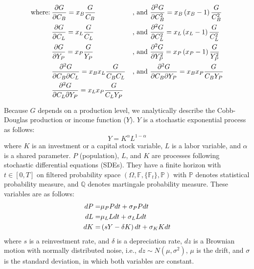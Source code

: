 \documentclass[sn-basic]{sn-jnl}%
\theoremstyle{thmstyleone}%
\theoremstyle{thmstyletwo}%
\theoremstyle{thmstylethree}%
\begin{document}
\begin{appendices}
	\begin{align}
			\text{where:}\: & \frac{\partial G}{\partial C_B}=x_B\frac{G}{C_B}       & \text{, and } & \frac{\partial^2 G}{\partial C_B^2}=x_B\left(x_B-1\right)\frac{G}{C_B^2}                         \notag\\
			& \frac{\partial G}{\partial C_L}=x_L\frac{G}{C_L}                     & \text{, and } & \frac{\partial^2 G}{\partial C_L^2}=x_L\left(x_L-1\right)\frac{G}{C_L^2}                         \notag\\
			& \frac{\partial G}{\partial Y_P}=x_P\frac{G}{Y_P}                     & \text{, and } & \frac{\partial^2 G}{\partial Y_P^2}=x_P\left(x_P-1\right)\frac{G}{Y_P^2}                         \notag\\
			& \frac{\partial^2 G}{\partial C_B\partial C_L}=x_Bx_L\frac{G}{C_BC_L} & \text{, and } & \frac{\partial^2 G}{\partial C_B\partial Y_P}=x_Bx_P\frac{G}{C_BY_P}  \notag\\
			& \frac{\partial^2 G}{\partial C_L\partial Y_P}=x_Lx_P\frac{G}{C_LY_P}    \notag                                                
	\end{align}

	Because $G$ depends on a production level, we analytically describe the Cobb-Douglas production or income function ($Y$). $Y$ is a stochastic exponential process as follows:
	\begin{equation}\label{GDP}
		Y=K^\alpha L^{1-\alpha}
	\end{equation}
	where $K$ is an investment or a capital stock variable, $L$ is a labor variable, and $\alpha$ is a shared parameter.
	$P$ (population), $L$, and $K$ are processes following stochastic differential equations (SDEs). They have a finite horizon with $t \in [0,T]$ on filtered probability space $\left(\Omega, \mathbb{F}, \{\mathbb{F}_t\}, \mathbb{P}\right)$ with $\mathbb{P}$ denotes statistical probability measure, and $\mathbb{Q}$ denotes martingale probability measure. These variables are as follows:
	\begin{align}
		dP=& \mu_P P dt + \sigma_P P dt \notag \\
		dL=& \mu_L L dt + \sigma_L L dt \notag \\
		dK=& \left(sY-\delta K\right) dt + \sigma_K K dt \notag
	\end{align}
	where $s$ is a reinvestment rate, and $\delta$ is a depreciation rate, $dz$ is a Brownian motion with normally distributed noise, i.e., $dz\sim N\left(\mu,\sigma^2\right)$, $\mu$ is the drift, and $\sigma$ is the standard deviation, in which both variables are constant.
	

\end{appendices}
\end{document}
